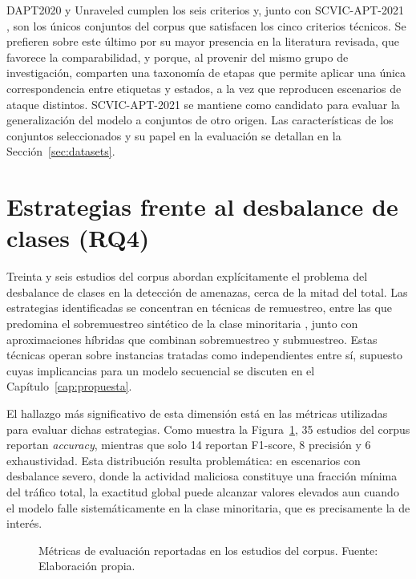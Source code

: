 DAPT2020 y Unraveled cumplen los seis criterios y, junto con SCVIC-APT-2021 \parencite{liu_new_2022}, son los únicos conjuntos del corpus que satisfacen los cinco criterios técnicos. Se prefieren sobre este último por su mayor presencia en la literatura revisada, que favorece la comparabilidad, y porque, al provenir del mismo grupo de investigación, comparten una taxonomía de etapas que permite aplicar una única correspondencia entre etiquetas y estados, a la vez que reproducen escenarios de ataque distintos. SCVIC-APT-2021 se mantiene como candidato para evaluar la generalización del modelo a conjuntos de otro origen. Las características de los conjuntos seleccionados y su papel en la evaluación se detallan en la Sección~\ref{sec:datasets}.

\section{Estrategias frente al desbalance de clases (RQ4)}

Treinta y seis estudios del corpus abordan explícitamente el problema del desbalance de clases en la detección de amenazas, cerca de la mitad del total. Las estrategias identificadas se concentran en técnicas de remuestreo, entre las que predomina el sobremuestreo sintético de la clase minoritaria \parencite{chawla2002smote}, junto con aproximaciones híbridas que combinan sobremuestreo y submuestreo. Estas técnicas operan sobre instancias tratadas como independientes entre sí, supuesto cuyas implicancias para un modelo secuencial se discuten en el Capítulo~\ref{cap:propuesta}.

El hallazgo más significativo de esta dimensión está en las métricas utilizadas para evaluar dichas estrategias. Como muestra la Figura~\ref{fig:metricas}, 35 estudios del corpus reportan \textit{accuracy}, mientras que solo 14 reportan F1-score, 8 precisión y 6 exhaustividad. Esta distribución resulta problemática: en escenarios con desbalance severo, donde la actividad maliciosa constituye una fracción mínima del tráfico total, la exactitud global puede alcanzar valores elevados aun cuando el modelo falle sistemáticamente en la clase minoritaria, que es precisamente la de interés.

\begin{figure}[h!]
\centering
{}
\caption{Métricas de evaluación reportadas en los estudios del corpus. Fuente: Elaboración propia.}
\label{fig:metricas}
\end{figure}
\FloatBarrier

